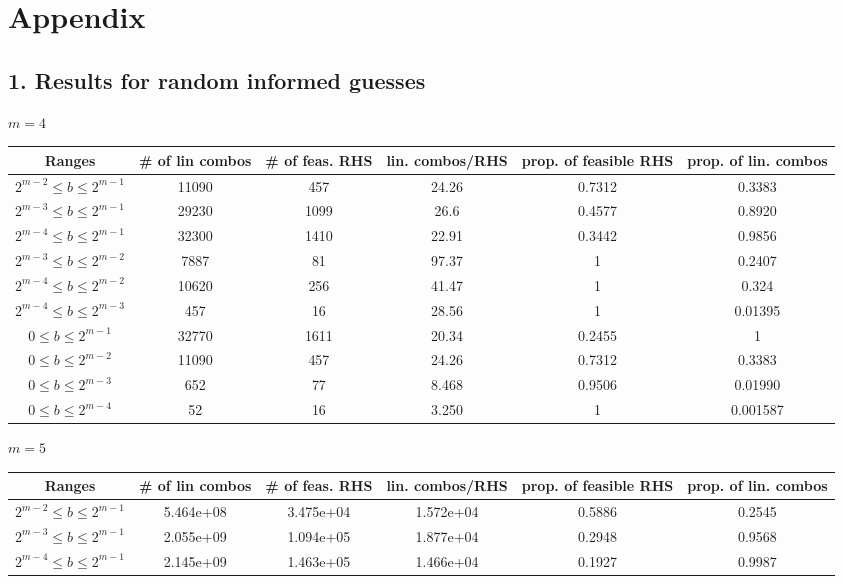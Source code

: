 \documentclass{article}
\begin{document}
\newpage


\newpage
\section*{Appendix}
\subsection*{1. \quad Results for random informed guesses}

\begin{adjustwidth}{-70pt}{-70pt}
$m = 4$
\begin{center}
    {\small
\begin{tabular}{c|c|c|c|c|c}
Ranges & \# of lin combos & \# of feas. RHS & lin. combos/RHS & prop. of feasible RHS & prop. of lin. combos \\
\hline
$2^{m-2} \leq b \leq 2^{m-1}$ & 11090 & 457 & 24.26 & 0.7312 & 0.3383 \\
$2^{m-3} \leq b \leq 2^{m-1}$ & 29230 & 1099 & 26.6 & 0.4577 & 0.8920 \\
$2^{m-4} \leq b \leq 2^{m-1}$ & 32300 & 1410 & 22.91 & 0.3442 & 0.9856 \\
$2^{m-3} \leq b \leq 2^{m-2}$ & 7887 & 81 & 97.37 & 1 & 0.2407 \\
$2^{m-4} \leq b \leq 2^{m-2}$ & 10620 & 256 & 41.47 & 1 & 0.324 \\
$2^{m-4} \leq b \leq 2^{m-3}$ & 457 & 16 & 28.56 & 1 & 0.01395 \\
$0 \leq b \leq 2^{m-1}$ & 32770 & 1611 & 20.34 & 0.2455 & 1 \\
$0 \leq b \leq 2^{m-2}$ & 11090 & 457 & 24.26 & 0.7312 & 0.3383 \\
$0 \leq b \leq 2^{m-3}$ & 652 & 77 & 8.468 & 0.9506 & 0.01990 \\
$0 \leq b \leq 2^{m-4}$ & 52 & 16 & 3.250 & 1 & 0.001587
\end{tabular}
}
\end{center}
$m = 5$
{\small
\begin{center}
    \begin{tabular}{c|c|c|c|c|c}
Ranges & {\# of lin combos} & \# of feas. RHS & lin. combos/RHS & prop. of feasible RHS & prop. of lin. combos \\
\hline
$2^{m-2} \leq b \leq 2^{m-1}$ & 5.464e+08 & 3.475e+04 & 1.572e+04 & 0.5886 & 0.2545 \\
$2^{m-3} \leq b \leq 2^{m-1}$ & 2.055e+09 & 1.094e+05 & 1.877e+04 & 0.2948 & 0.9568 \\
$2^{m-4} \leq b \leq 2^{m-1}$ & 2.145e+09 & 1.463e+05 & 1.466e+04 & 0.1927 & 0.9987 \\

\end{tabular}
\end{center}}
\end{adjustwidth}
\end{document}
